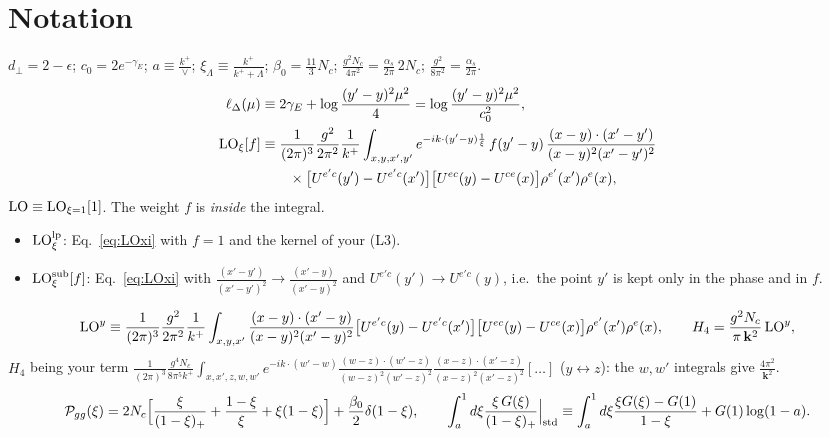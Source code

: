 \documentclass[10pt]{article}
\numberwithin{equation}{section}
\newcommand{\LO}{{\rm LO}}
\begin{document}
\section{Notation}\label{sec:notation}
$d_\perp=2-\epsilon$; $c_0=2e^{-\gamma_E}$; $a\equiv\frac{k^+}{\vee}$; $\xi_\Lambda\equiv\frac{k^+}{k^++\Lambda}$; $\beta_0=\frac{11}{3}N_c$; $\frac{g^2N_c}{4\pi^2}=\frac{\alpha_s}{2\pi}\,2N_c$; $\frac{g^2}{8\pi^2}=\frac{\alpha_s}{2\pi}$.
\begin{align}
\ell_\Delta(\mu)&\equiv2\gamma_E+\log\frac{(y'-y)^2\mu^2}{4}=\log\frac{(y'-y)^2\mu^2}{c_0^2},\\
\LO_\xi[f]&\equiv\frac{1}{(2\pi)^{3}}\frac{g^{2}}{2\pi^{2}}\frac{1}{k^{+}}\int_{x,y,x',y'}e^{-ik\cdot(y'-y)\frac1\xi}\,f(y'-y)\,\frac{(x-y)\cdot(x'-y')}{(x-y)^{2}(x'-y')^{2}}\notag\\&\qquad\times\big[U^{e'c}(y')-U^{e'c}(x')\big]\big[U^{ec}(y)-U^{ce}(x)\big]\rho^{e'}(x')\rho^{e}(x),\label{eq:LOxi}
\end{align}
$\LO\equiv\LO_{\xi=1}[1]$. The weight $f$ is \emph{inside} the integral.
\begin{itemize}
\item $\LO^{\rm lp}_\xi$: Eq.~\eqref{eq:LOxi} with $f=1$ and the kernel of your (L3).
\item $\LO^{\rm sub}_\xi[f]$: Eq.~\eqref{eq:LOxi} with $\frac{(x'-y')}{(x'-y')^2}\to\frac{(x'-y)}{(x'-y)^2}$ and $U^{e'c}(y')\to U^{e'c}(y)$, i.e.\ the point $y'$ is kept only in the phase and in $f$.
\end{itemize}
\begin{equation}
\LO^y\equiv\frac{1}{(2\pi)^{3}}\frac{g^{2}}{2\pi^{2}}\frac{1}{k^{+}}\int_{x,y,x'}\frac{(x-y)\cdot(x'-y)}{(x-y)^{2}(x'-y)^{2}}\big[U^{e'c}(y)-U^{e'c}(x')\big]\big[U^{ec}(y)-U^{ce}(x)\big]\rho^{e'}(x')\rho^{e}(x),\qquad H_4=\frac{g^2N_c}{\pi\,\mathbf k^2}\,\LO^y,\label{eq:H4}
\end{equation}
$H_4$ being your term $\frac{1}{(2\pi)^3}\frac{g^4N_c}{8\pi^5k^+}\int_{x,x',z,w,w'}e^{-ik\cdot(w'-w)}\frac{(w-z)\cdot(w'-z)}{(w-z)^2(w'-z)^2}\frac{(x-z)\cdot(x'-z)}{(x-z)^2(x'-z)^2}[\dots]$ ($y\leftrightarrow z$): the $w,w'$ integrals give $\frac{4\pi^2}{\mathbf k^2}$.
\begin{equation}
\mathcal P_{gg}(\xi)=2N_c\Big[\frac{\xi}{(1-\xi)_+}+\frac{1-\xi}{\xi}+\xi(1-\xi)\Big]+\frac{\beta_0}{2}\delta(1-\xi),\qquad\int_a^1d\xi\frac{\xi\,G(\xi)}{(1-\xi)_+}\Big|_{\rm std}\equiv\int_a^1d\xi\frac{\xi G(\xi)-G(1)}{1-\xi}+G(1)\log(1-a).\label{eq:Pgg}
\end{equation}
\end{document}
